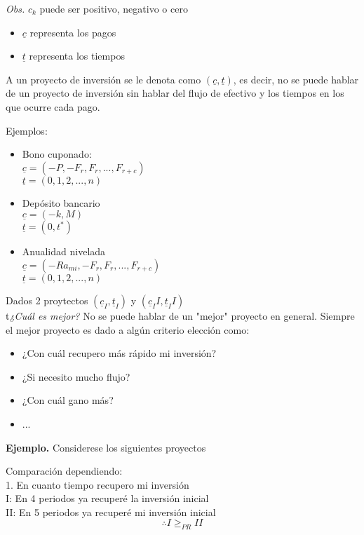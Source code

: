 \textit{Obs.} $c_k$ puede ser positivo, negativo o cero
\begin{itemize}
    \item $\underline{c}$ representa los pagos
    \item $\underline{t}$ representa los tiempos
\end{itemize}

A un proyecto de inversión se le denota como $(\underline{c},\underline{t})$, es decir, no se puede hablar de un proyecto de inversión sin hablar del flujo de efectivo y los tiempos en los que ocurre cada pago.

Ejemplos:
\begin{itemize}
    \item Bono cuponado:\\
    $\underline{c} = (-P,-F_r,F_r,...,F_{r+c})$\\
    $\underline{t} = (0,1,2,...,n)$
    \item Depósito bancario\\
    $\underline{c} = (-k,M)$\\
    $\underline{t} = (0,t^*)$
    \item Anualidad nivelada\\
    $\underline{c} = (-Ra_{{m}i},-F_r,F_r,...,F_{r+c})$\\
    $\underline{t} = (0,1,2,...,n)$
\end{itemize}

Dados 2 proytectos $(\underline{c}_I,\underline{t}_I)$ y $(\underline{c}_II,\underline{t}_II)$\\
t\textit{¿Cuál es mejor?} No se puede hablar de un "mejor" proyecto en general. Siempre el mejor proyecto es dado a algún criterio elección como:

\begin{itemize}
    \item ¿Con cuál recupero más rápido mi inversión?
    \item ¿Si necesito mucho flujo?
    \item ¿Con cuál gano más?
    \item ...
\end{itemize}

\textbf{Ejemplo.} Considerese los siguientes proyectos

Comparación dependiendo:\\
1. En cuanto tiempo recupero mi inversión \\
I: En 4 periodos ya recuperé la inversión inicial\\
II: En 5 periodos ya recuperé mi inversión inicial
$$\therefore I\geq_{PR} II$$
\\

